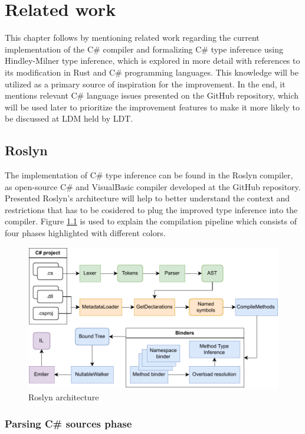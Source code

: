 \chapter{Related work}

This chapter follows by mentioning related work regarding the current implementation of the C\# compiler and formalizing C\# type inference using Hindley-Milner type inference, which is explored in more detail with references to its modification in Rust and C\# programming languages.
This knowledge will be utilized as a primary source of inspiration for the improvement.
In the end, it mentions relevant C\# language issues presented on the GitHub repository, which will be used later to prioritize the improvement features to make it more likely to be discussed at \ac{LDM} held by \ac{LDT}. 

\section{Roslyn}

The implementation of C\# type inference can be found in the Roslyn compiler, as open-source C\# and VisualBasic compiler developed at the GitHub repository. 
Presented Roslyn’s architecture will help to better understand the context and restrictions that has to be cosidered to plug the improved type inference into the compiler.
Figure \ref{img15:roslynPip} is used to explain the compilation pipeline \cite{online:roslynArchitecture} which consists of four phases highlighted with different colors.
\begin{figure}[h]
\centering
\includegraphics[width=140mm]{./img/Roslyn.pdf}
\caption{Roslyn architecture}
\label{img15:roslynPip}
\end{figure}

\subsection{Parsing C\# sources phase}

